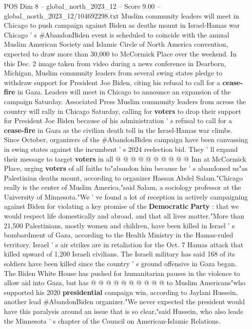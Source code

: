 \begin{textsample}{POS Dim 8 – global\_north\_2023\_12 – Score 9.00 – global\_north\_2023\_12/104692298.txt}  \label{ex:f8_pos_118}
Muslim community leaders will meet in Chicago to push campaign against Biden as deaths mount in Israel-Hamas war Chicago ' s \#AbandonBiden event is scheduled to coincide with the annual Muslim American Society and Islamic Circle of North America convention, expected to draw more than 30,000 to McCormick Place over the weekend.
In this Dec. 2 image taken from video during a news conference in Dearborn, Michigan, Muslim community leaders from several swing states pledge to withdraw support for President Joe Biden, citing his refusal to call for a \textbf{cease-fire} in Gaza.
Leaders will meet in Chicago to announce an expansion of the campaign Saturday.
Associated Press Muslim community leaders from across the country will rally in Chicago Saturday, calling for \textbf{voters} to drop their support for President Joe Biden because of his administration ' s refusal to call for a \textbf{cease-fire} in Gaza as the civilian death toll in the Israel-Hamas war climbs.
Since October, organizers of the \#AbandonBiden campaign have been canvassing in swing states against the incumbent ' s 2024 reelection bid.
They ' ll expand their message to target \textbf{voters} in all @ @ @ @ @ @ @ @ @ @ Inn at McCormick Place, urging \textbf{voters} of all faiths to"abandon him because he ' s abandoned us"as Palestinian deaths mount, according to organizer Hassan Abdel Salam."Chicago really is the center of Muslim America,"said Salam, a sociology professor at the University of Minnesota."We ' ve found a lot of reception in actively campaigning against Biden for violating a key promise of the \textbf{Democratic} \textbf{Party} : that we would respect life domestically and abroad, and that all lives matter."More than 21,500 Palestinians, mostly women and children, have been killed in Israel ' s bombardment of Gaza, according to the Health Ministry in the Hamas-ruled territory.
Israel ' s air strikes are in retaliation for the Oct. 7 Hamas attack that killed upward of 1,200 Israeli civilians.
The Israeli military has said 168 of its soldiers have been killed since the country ' s ground offensive in Gaza began.
The Biden White House has pushed for humanitarian pauses in the violence to allow aid into Gaza, but has @ @ @ @ @ @ @ @ @ @ to Muslim Americans"who supported his 2020 \textbf{presidential} campaign win, according to Jaylani Hussein, another lead \#AbandonBiden organizer."We never expected the president would have this paralysis around an issue that is so clear,"said Hussein, who also leads the Minnesota ' s chapter of the Council on American-Islamic Relations.

\end{textsample}
